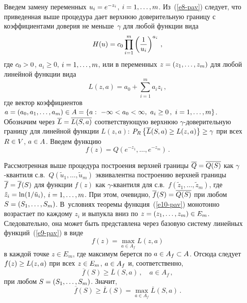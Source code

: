 \begin{multicols}{2}
     Введем замену переменных $u_i\hm =e^{-z_i}$, $i\hm= 1, \ldots , m$. 
Из~(\ref{e8-pav}) следует, что приведенная выше процедура дает верхнюю 
доверительную границу с коэффициентами доверия не меньше~$\gamma$ 
для любой функции вида
     $$
     H(u) =c_0 \prod\limits_{i=1}^m \left( \displaystyle\frac{\displaystyle 1\mathstrut}{\displaystyle u_i\mathstrut}\right)^{a_i}\,,
     $$
где $c_0\hm>0$, $a_i\geq 0$, $i\hm= 1,\ldots ,m$,  или в переменных $z\hm= 
(z_1, \ldots , z_m)$ для любой линейной функции вида
\begin{equation}
L(z,a) =a_0+\sum\limits_{i=1}^m a_i z_i\,,
\label{e9-pav}
\end{equation}
где вектор коэффициентов $a\hm= (a_0, a_1, \ldots , a_m) \hm\in A\hm = \{ a:\ -
\infty<a_0 <\infty,\ a_i \geq 0\,,\ i=1, \ldots , m\}$. Обозначим через 
$\overline{L}\hm= \overline{L(S,a)}$ соответствующую верхнюю 
$\gamma$-до\-ве\-ри\-тель\-ную границу для линейной функции $L(z,a)$: 
$P_R\left\{ \overline{L}(S,a)\hm\geq L(z,a)\right\}\hm\geq \gamma$ при всех 
$R\hm\in V$, $a\hm\in A$. Введем функцию
\begin{equation}
f(z) =Q\left( e^{-z_1}, \ldots , e^{-z_m}\right)\,.
\label{e10-pav}
\end{equation}

Рассмотренная выше процедура построения верхней границы 
$\overline{Q}\hm= \overline{Q(S)}$ как $\gamma$-кван\-ти\-ля с.в.\ 
$Q(\tilde{u}_1, \ldots , \tilde{u}_m)$ эквивалентна построению верхней 
границы $\overline{f}\hm= \overline{f}(S)$ для функции $f(z)$ как 
$\gamma$-кван\-ти\-ля для с.в.\ $f(\tilde{z}_1, \ldots , \tilde{z}_m)$, где 
$\tilde{z}_i\hm= \ln (1/\tilde{u}_i)$, $i\hm= 1,\ldots , m$. При этом, очевидно, 
$\overline{f}(S)\hm= \overline{Q(S)}$ при любом $S\hm= (S_1,\ldots ,S_m)$. 
В~условиях теоремы функция~(\ref{e10-pav}) монотонно возрастает по 
каждому $z_i$ и выпукла вниз по $z\hm= (z_1,\ldots ,z_m)\hm\in E_m$. 
Следовательно, она может быть представлена через базовую систему 
линейных функций~(\ref{e9-pav}) в виде
\begin{equation}
f(z) =\max\limits_{a\in A_f} L(z,a)
\label{e11-pav}
\end{equation}
в каждой точке $z\in E_m$, где максимум берется по $a\hm\in A_f\subset A$. 
Отсюда следует $f(z)\hm\geq L(z,a)$ при всех $z\hm\in E_m$, $a\hm\in A_f$ и, 
соответственно, 
$$
\overline{f}(S)\geq \overline{L}(S,a)\,,\quad a\in A_f\,,
$$
при любом $S\hm= (S_1, \ldots , S_m)$. Значит, 
\begin{equation}
\overline{f}(S)\geq \overline{L}(S) = \max\limits_{a\in A_f} \overline{L}(S,a)\,.
\label{e12-pav}
\end{equation}


\end{multicols}
